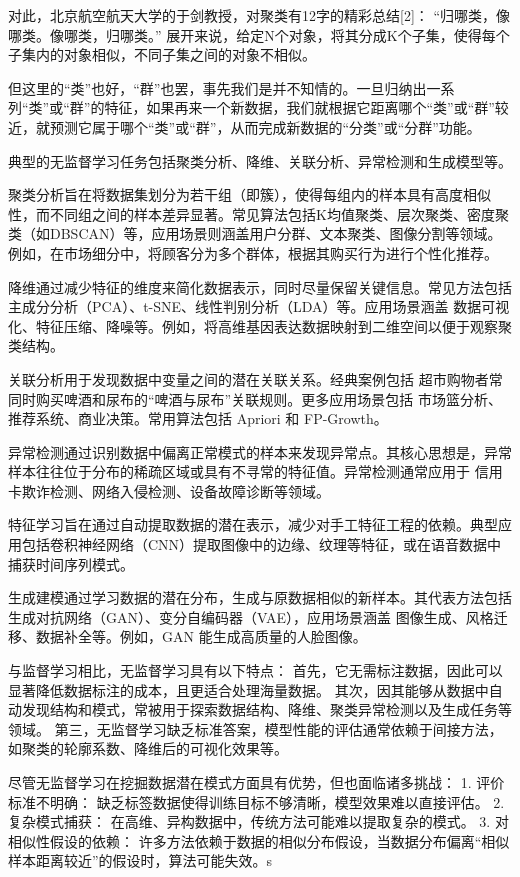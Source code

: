 对此，北京航空航天大学的于剑教授，对聚类有12字的精彩总结[2]：
“归哪类，像哪类。像哪类，归哪类。”
展开来说，给定N个对象，将其分成K个子集，使得每个子集内的对象相似，不同子集之间的对象不相似。

但这里的“类”也好，“群”也罢，事先我们是并不知情的。一旦归纳出一系列“类”或“群”的特征，如果再来一个新数据，我们就根据它距离哪个“类”或“群”较近，就预测它属于哪个“类”或“群”，从而完成新数据的“分类”或“分群”功能。

典型的无监督学习任务包括聚类分析、降维、关联分析、异常检测和生成模型等。

聚类分析旨在将数据集划分为若干组（即簇），使得每组内的样本具有高度相似性，而不同组之间的样本差异显著。常见算法包括K均值聚类、层次聚类、密度聚类（如DBSCAN）等，应用场景则涵盖用户分群、文本聚类、图像分割等领域。例如，在市场细分中，将顾客分为多个群体，根据其购买行为进行个性化推荐。

降维通过减少特征的维度来简化数据表示，同时尽量保留关键信息。常见方法包括主成分分析（PCA）、t-SNE、线性判别分析（LDA）等。应用场景涵盖 数据可视化、特征压缩、降噪等。例如，将高维基因表达数据映射到二维空间以便于观察聚类结构。

关联分析用于发现数据中变量之间的潜在关联关系。经典案例包括 超市购物者常同时购买啤酒和尿布的“啤酒与尿布”关联规则。更多应用场景包括 市场篮分析、推荐系统、商业决策。常用算法包括 Apriori 和 FP-Growth。

异常检测通过识别数据中偏离正常模式的样本来发现异常点。其核心思想是，异常样本往往位于分布的稀疏区域或具有不寻常的特征值。异常检测通常应用于 信用卡欺诈检测、网络入侵检测、设备故障诊断等领域。

特征学习旨在通过自动提取数据的潜在表示，减少对手工特征工程的依赖。典型应用包括卷积神经网络（CNN）提取图像中的边缘、纹理等特征，或在语音数据中捕获时间序列模式。

生成建模通过学习数据的潜在分布，生成与原数据相似的新样本。其代表方法包括生成对抗网络（GAN）、变分自编码器（VAE），应用场景涵盖 图像生成、风格迁移、数据补全等。例如，GAN 能生成高质量的人脸图像。

与监督学习相比，无监督学习具有以下特点：
首先，它无需标注数据，因此可以显著降低数据标注的成本，且更适合处理海量数据。
其次，因其能够从数据中自动发现结构和模式，常被用于探索数据结构、降维、聚类异常检测以及生成任务等领域。
第三，无监督学习缺乏标准答案，模型性能的评估通常依赖于间接方法，如聚类的轮廓系数、降维后的可视化效果等。

尽管无监督学习在挖掘数据潜在模式方面具有优势，但也面临诸多挑战：
1. 评价标准不明确： 缺乏标签数据使得训练目标不够清晰，模型效果难以直接评估。
2. 复杂模式捕获： 在高维、异构数据中，传统方法可能难以提取复杂的模式。
3. 对相似性假设的依赖： 许多方法依赖于数据的相似分布假设，当数据分布偏离“相似样本距离较近”的假设时，算法可能失效。s

